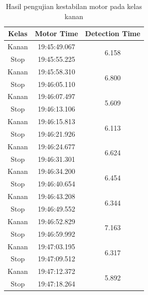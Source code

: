 \begin{longtable}{|c|c|c|}
  \caption{Hasil pengujian kestabilan motor pada kelas kanan} 
  \label{tb:motorkanan} \\
  \hline
  \rowcolor[HTML]{C0C0C0} 
  \textbf{Kelas} & \textbf{Motor Time} & \textbf{Detection Time} \\ \hline
  Kanan          & 19:45:49.067        & \multirow{2}{*}{6.158}  \\ \cline{1-2}
  Stop           & 19:45:55.225        &                         \\ \hline
  Kanan          & 19:45:58.310        & \multirow{2}{*}{6.800}  \\ \cline{1-2}
  Stop           & 19:46:05.110        &                         \\ \hline
  Kanan          & 19:46:07.497        & \multirow{2}{*}{5.609}  \\ \cline{1-2}
  Stop           & 19:46:13.106        &                         \\ \hline
  Kanan          & 19:46:15.813        & \multirow{2}{*}{6.113}  \\ \cline{1-2}
  Stop           & 19:46:21.926        &                         \\ \hline
  Kanan          & 19:46:24.677        & \multirow{2}{*}{6.624}  \\ \cline{1-2}
  Stop           & 19:46:31.301        &                         \\ \hline
  Kanan          & 19:46:34.200        & \multirow{2}{*}{6.454}  \\ \cline{1-2}
  Stop           & 19:46:40.654        &                         \\ \hline
  Kanan          & 19:46:43.208        & \multirow{2}{*}{6.344}  \\ \cline{1-2}
  Stop           & 19:46:49.552        &                         \\ \hline
  Kanan          & 19:46:52.829        & \multirow{2}{*}{7.163}  \\ \cline{1-2}
  Stop           & 19:46:59.992        &                         \\ \hline
  Kanan          & 19:47:03.195        & \multirow{2}{*}{6.317}  \\ \cline{1-2}
  Stop           & 19:47:09.512        &                         \\ \hline
  Kanan          & 19:47:12.372        & \multirow{2}{*}{5.892}  \\ \cline{1-2}
  Stop           & 19:47:18.264        &                         \\ \hline

\end{longtable}
